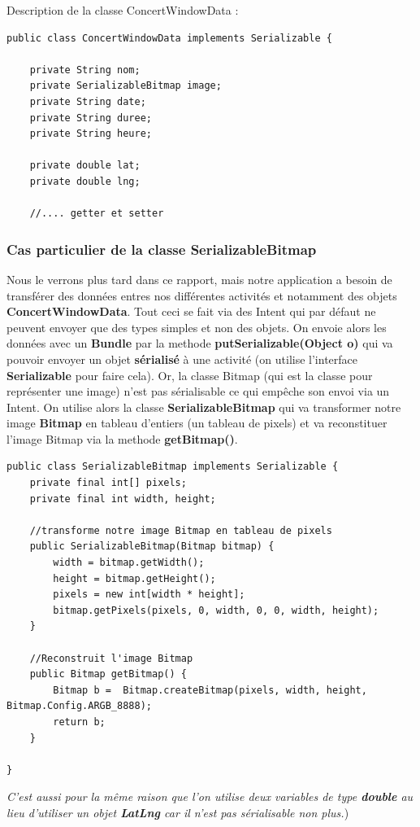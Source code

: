 \documentclass{article}
\begin{document}
Description de la classe ConcertWindowData : 
\begin{verbatim}
public class ConcertWindowData implements Serializable {

    private String nom;
    private SerializableBitmap image;
    private String date;
    private String duree;
    private String heure;

    private double lat;
    private double lng;
    
    //.... getter et setter 
\end{verbatim}
\subsubsection{Cas particulier de la classe SerializableBitmap} 
\label{subsubsection:prob_image}
Nous le verrons plus tard dans ce rapport, mais notre application a besoin de transférer des données entres nos différentes activités et notamment des objets \textbf{ConcertWindowData}. Tout ceci se fait via des Intent qui par défaut ne peuvent envoyer que des types simples et non des objets. On envoie alors les données avec un \textbf{Bundle} par la methode \textbf{putSerializable(Object o)} qui va pouvoir envoyer un objet \textbf{sérialisé} à une activité (on utilise l'interface \textbf{Serializable} pour faire cela). Or, la classe Bitmap (qui est la classe pour représenter une image) n'est pas sérialisable ce qui empêche son envoi via un Intent. On utilise alors la classe \textbf{SerializableBitmap} qui va transformer notre image \textbf{Bitmap} en tableau d'entiers (un tableau de pixels) et va reconstituer l'image Bitmap via la methode \textbf{getBitmap()}.
\begin{verbatim}
public class SerializableBitmap implements Serializable {
    private final int[] pixels;
    private final int width, height;
    
    //transforme notre image Bitmap en tableau de pixels
    public SerializableBitmap(Bitmap bitmap) {
        width = bitmap.getWidth();
        height = bitmap.getHeight();
        pixels = new int[width * height];
        bitmap.getPixels(pixels, 0, width, 0, 0, width, height);
    }

    //Reconstruit l'image Bitmap
    public Bitmap getBitmap() {
        Bitmap b =  Bitmap.createBitmap(pixels, width, height, Bitmap.Config.ARGB_8888);
        return b;
	}

}
\end{verbatim}
\textit{C'est aussi pour la même raison que l'on utilise deux variables de type \textbf{double} au lieu d'utiliser un objet \textbf{LatLng} car il n'est pas sérialisable non plus.})
\end{document}
